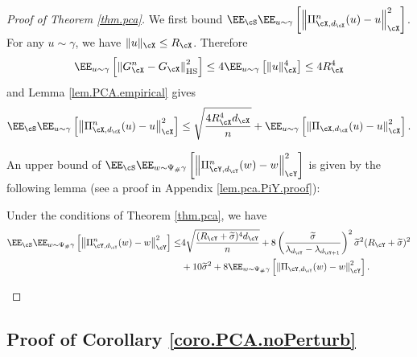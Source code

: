 \documentclass[11pt]{article} %
\begin{document}
\begin{proof}[Proof of Theorem \ref{thm.pca}]
We first bound $\EE_{\cS}\EE_{u\sim\gamma} \left[ \left\|\Pi_{\cX,d_{\cX}}^n(u)-u\right\|_{\cX}^2\right]$.
For any $u\sim\gamma$, we have $\|u\|_{\cX}\leq R_{\cX}$. Therefore
$$
\EE_{u\sim \gamma} \left[  \left\|G_{\cX}^n-G_{\cX}\right\|_{\rm HS}^2 \right]\leq 4\EE_{u\sim \gamma} \left[ \|u\|_{\cX}^4\right]\leq 4R_{\cX}^4
$$
and Lemma \ref{lem.PCA.empirical} gives
\begin{align}
	\EE_{\cS}\EE_{u\sim\gamma} \left[ \left\|\Pi_{\cX,d_{\cX}}^n(u)-u\right\|_{\cX}^2 \right]\leq \sqrt{\frac{4R_{\cX}^4d_{\cX}}{n}}+\EE_{u\sim\gamma} \left[ \left\|\Pi_{\cX,d_{\cX}}(u)-u\right\|_{\cX}^2\right].
	\label{eq.PCA.errorX}
\end{align}

An upper bound of $\EE_{\cS}\EE_{w\sim \Psi_{\#}\gamma} \left[ \left\|\Pi_{\cY,d_{\cY}}^n(w)-w\right\|_{\cY}^2\right]$ is given by the following lemma (see a proof in Appendix \ref{lem.pca.PiY.proof}):
\begin{lemma}\label{lem.pca.PiY}
	Under the conditions of Theorem \ref{thm.pca}, we have
	\begin{align}
		\EE_{\cS}\EE_{w\sim \Psi_{\#}\gamma} \left[ \left\|\Pi_{\cY,d_{\cY}}^n(w)-w\right\|_{\cY}^2\right]\leq& 4\sqrt{\frac{(R_{\cY}+\widetilde{\sigma})^4d_{\cY}}{n}}+8\left(\frac{\widetilde{\sigma}}{\lambda_{d_{\cY}}-\lambda_{d_{\cY+1}}}\right)^2\widetilde{\sigma}^2(R_{\cY}+\widetilde{\sigma})^2\nonumber\\
		&+10\widetilde{\sigma}^2+ 8\EE_{w\sim \Psi_{\#}\gamma}\left[ \left\|\Pi_{\cY,d_{\cY}}(w)-w\right\|_{\cY}^2\right].
		\label{eq.pca.PiY}
	\end{align}
\end{lemma}



\end{proof}

\subsection{Proof of Corollary \ref{coro.PCA.noPerturb}}\label{coro.PCA.noPerturb.proof}
\end{document}
